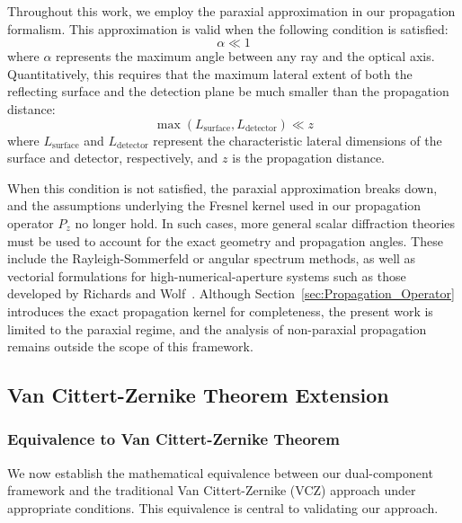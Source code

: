 \documentclass[a4paper,12pt]{article}
\begin{document}
Throughout this work, we employ the paraxial approximation in our propagation formalism. This approximation is valid when the following condition is satisfied:
\begin{equation}
\alpha \ll 1
\end{equation}
where $\alpha$ represents the maximum angle between any ray and the optical axis. Quantitatively, this requires that 
the maximum lateral extent of both the reflecting surface and the detection plane be much smaller than the propagation 
distance:
\begin{equation} \label{eq:maximum_propagation_distance_condition}
\max(L_{\text{surface}}, L_{\text{detector}}) \ll z
\end{equation}
where $L_{\text{surface}}$ and $L_{\text{detector}}$ represent the characteristic lateral dimensions of the surface and 
detector, respectively, and $z$ is the propagation distance. 

When this condition is not satisfied, the paraxial approximation breaks down, and the assumptions underlying the 
Fresnel kernel used in our propagation operator \( P_z \) no longer hold. In such cases, more general scalar diffraction 
theories must be used to account for the exact geometry and propagation angles. 
These include the Rayleigh-Sommerfeld \cite{goodman2005introduction} or 
angular spectrum methods, as well as vectorial formulations for high-numerical-aperture systems such as those developed by 
Richards and Wolf~\cite{RichardsWolf1959}. Although Section~\ref{sec:Propagation_Operator} introduces the exact propagation kernel for completeness, the present work is 
limited to the paraxial regime, and the analysis of non-paraxial propagation remains outside the scope of this framework.

\subsection{Van Cittert-Zernike Theorem Extension}

\subsubsection{Equivalence to Van Cittert-Zernike Theorem} \label{sec:brief_outline_of_the_equivalence_proof}

We now establish the mathematical equivalence between our dual-component framework and the 
traditional Van Cittert-Zernike (VCZ) approach under appropriate conditions. This equivalence is central to 
validating our approach.
\end{document}
